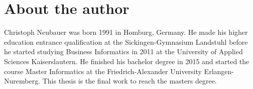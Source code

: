 %
% 
\chapter{About the author}
Christoph Neubauer was born 1991 in Homburg, Germany. He made his higher education entrance qualification at the Sickingen-Gymnasium Landstuhl before he started studying Business Informatics in 2011 at the University of Applied Sciences Kaiserslautern. He finished his bachelor degree in 2015 and started the course Master Informatics at the Friedrich-Alexander University Erlangen-Nuremberg. This thesis is the final work to reach the masters degree.